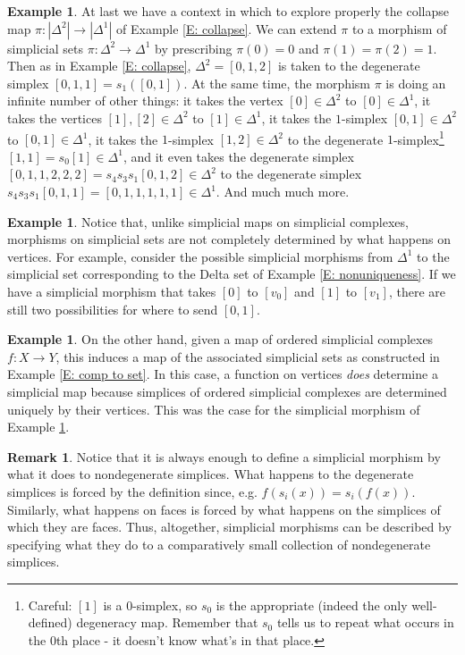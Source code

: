 \documentclass[12pt]{article}
\theoremstyle{plain}
\theoremstyle{definition}
\newtheorem{remark}[theorem]{Remark}
\newtheorem{example}[theorem]{Example}
\begin{document}
\begin{example}\label{E: simp mor v}
At last we have a context in which to explore properly the collapse map $\pi\colon|\Delta^2|\to |\Delta^1|$ of Example \ref{E: collapse}. We can extend $\pi$  to a morphism of simplicial sets $\pi\colon\Delta^2\to\Delta^1$ by prescribing $\pi(0)=0$ and $\pi(1)=\pi(2)=1$. Then as in Example \ref{E: collapse},  $\Delta^2=[0,1,2]$ is taken to the degenerate simplex $[0,1,1]=s_1([0,1])$. At the same time, the morphism $\pi$ is doing an infinite number of other things: it takes the vertex $[0]\in \Delta^2$ to $[0]\in \Delta^1$, it takes the vertices $[1],[2]\in \Delta^2$ to $[1]\in \Delta^1$, it takes the $1$-simplex $[0,1]\in \Delta^2$ to $[0,1]\in \Delta^1$, it takes the $1$-simplex $[1,2]\in \Delta^2$ to the degenerate $1$-simplex\footnote{Careful: $[1]$ is a $0$-simplex, so $s_0$ is the appropriate (indeed the only well-defined) degeneracy map. Remember that $s_0$ tells us to repeat what occurs in the $0$th place - it doesn't know what's in that place.} $[1,1]=s_0[1]\in \Delta^1$, and it even takes the degenerate simplex $[0,1,1,2,2,2]=s_4s_3s_1[0,1,2]\in \Delta^2$ to the degenerate simplex 
$s_4s_3s_1[0,1,1]=[0,1,1,1,1,1]\in \Delta^1$. And much much more. 
\end{example}

\begin{example}Notice that, unlike simplicial maps on simplicial complexes,  morphisms on simplicial sets are not completely determined by what happens on vertices. For example, consider the possible simplicial morphisms from $\Delta^1$ to the simplicial set corresponding to the Delta set of Example \ref{E: nonuniqueness}. If we have a simplicial morphism that takes $[0]$ to $[v_0]$ and $[1]$ to $[v_1]$, there are still two possibilities for where to send $[0,1]$. 
\end{example}


\begin{example}
On the other hand, given a map of ordered simplicial complexes $f\colon X\to Y$, this induces a map of the associated simplicial sets as constructed in Example \ref{E: comp to set}. In this case, a function on vertices \emph{does} determine a simplicial map because simplices of ordered simplicial complexes are determined uniquely by their vertices. 
This was the case for the simplicial morphism of Example \ref{E: simp mor v}.
\end{example}



\begin{remark}\label{R: map faces}
Notice that it is always enough to define a simplicial morphism by what it does to nondegenerate simplices. What happens to the degenerate simplices is forced by the definition since, e.g. $f(s_i(x))=s_i(f(x))$. Similarly, what happens on faces is forced by what happens on the simplices of which they are faces. Thus, altogether,  simplicial morphisms can be described  by specifying  what they do to a comparatively small collection of nondegenerate simplices.
\end{remark}
\end{document}
